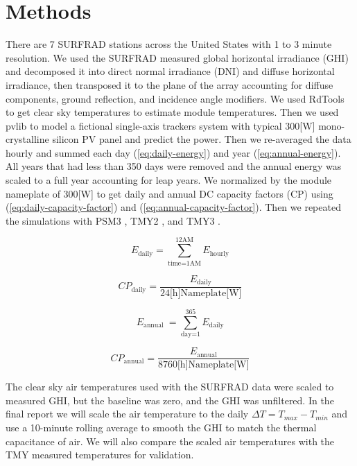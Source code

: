 \documentclass[conference]{IEEEtran}
\begin{document}
\section{Methods}
There are 7 SURFRAD stations \cite{Augustine2000} across the United States with 1 to 3 minute resolution. We used the SURFRAD measured global horizontal irradiance (GHI) and decomposed it into direct normal irradiance (DNI) and diffuse horizontal irradiance, then transposed it to the plane of the array accounting for diffuse components, ground reflection, and incidence angle modifiers. We used RdTools \cite{Jordan2018} to get clear sky temperatures to estimate module temperatures. Then we used pvlib \cite{F.Holmgren2018} to model a fictional single-axis trackers system with typical 300[W] mono-crystalline silicon PV panel and predict the power. Then we re-averaged the data hourly and summed each day (\ref{eq:daily-energy}) and year (\ref{eq:annual-energy}). All years that had less than 350 days were removed and the annual energy was scaled to a full year accounting for leap years. We normalized by the module nameplate of 300[W] to get daily and annual DC capacity factors (CP) using (\ref{eq:daily-capacity-factor}) and (\ref{eq:annual-capacity-factor}). Then we repeated the simulations with PSM3 \cite{Habte2017}, TMY2 \cite{Marion1995}, and TMY3 \cite{Wilcox2008}.

\begin{equation}
E_\text{daily} = \sum_\text{time=1AM}^\text{12AM}{E_\text{hourly}} \label{eq:daily-energy}
\end{equation}

\begin{equation}
\mathit{CP}_\text{daily} = \frac{E_\text{daily}}{ 24\text{[h]} \text{Nameplate[W]} } \label{eq:daily-capacity-factor}
\end{equation}

\begin{equation}
E_\text{annual }= \sum_\text{day=1}^\text{365}{E_\text{daily}} \label{eq:annual-energy}
\end{equation}

\begin{equation}
\mathit{CP}_\text{annual} = \frac{E_\text{annual}}{ 8760\text{[h]} \text{Nameplate[W]} } \label{eq:annual-capacity-factor}
\end{equation}

The clear sky air temperatures used with the SURFRAD data were scaled to measured GHI, but the baseline was zero, and the GHI was unfiltered. In the final report we will scale the air temperature to the daily $\Delta T = T_{max} - T_{min}$ and use a 10-minute rolling average to smooth the GHI to match the thermal capacitance of air. We will also compare the scaled air temperatures with the TMY measured temperatures for validation.
\end{document}
